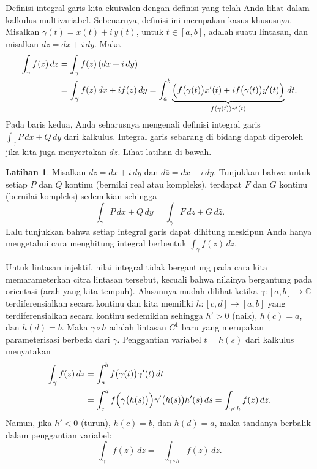\documentclass[12pt,openany]{book}
\newcommand{\C}{{\mathbb{C}}}
\theoremstyle{plain}
\theoremstyle{remark}
\theoremstyle{definition}
\newenvironment{exbox}{%
    \def\FrameCommand{\vrule width 1pt \relax\hspace{10pt}}%
    \MakeFramed{\advance\hsize-\width\FrameRestore}%
}{%
    \endMakeFramed
}
\theoremstyle{exercise}
\newtheorem{exercise}{Latihan}[section]
\theoremstyle{example}
\begin{document}
Definisi integral garis kita ekuivalen dengan definisi yang
telah Anda lihat dalam kalkulus multivariabel.  Sebenarnya, definisi ini merupakan kasus khususnya.
Misalkan $\gamma(t) = x(t) +i \, y(t)$, untuk $t \in [a,b]$, adalah suatu lintasan,
dan misalkan $dz = dx + i\, dy$.
Maka
\begin{equation*}
\begin{split}
\int_{\gamma} f(z) \, dz
& =
\int_{\gamma} f(z) \, (dx + i\, dy)
\\
& =
\int_{\gamma} f(z) \, dx + i f(z) \, dy
=
\int_a^b \underbrace{\Bigl( f\bigl(\gamma(t)\bigr) x'(t) + i f\bigl(\gamma(t)\bigr) y'(t) \Bigr)}_{f(\gamma(t)) \gamma'(t)} \, dt .
\end{split}
\end{equation*}
Pada baris kedua, Anda seharusnya mengenali definisi integral garis
$\int_\gamma P\,dx + Q \, dy$ dari kalkulus.  Integral garis sebarang
di bidang dapat diperoleh jika kita juga menyertakan $d\bar{z}$.  Lihat
latihan di bawah.

\begin{exbox}
\begin{exercise} \label{exercise:realpathintegral}
%
Misalkan $dz = dx + i \, dy$ dan
$d\bar{z} = dx - i \, dy$.  Tunjukkan bahwa untuk setiap $P$ dan $Q$ kontinu (bernilai real atau kompleks),
terdapat $F$ dan $G$ kontinu (bernilai kompleks) sedemikian sehingga
\begin{equation*}
\int_{\gamma} P \, dx + Q \, dy
=
\int_{\gamma} F \, dz + G \, d\bar{z} .
\end{equation*}
Lalu tunjukkan bahwa setiap integral garis
dapat dihitung meskipun Anda hanya mengetahui cara menghitung integral berbentuk
$\int_\gamma f(z) \, dz$.
\end{exercise}
\end{exbox}

Untuk lintasan injektif, nilai integral tidak bergantung pada cara
kita memarameterkan citra lintasan tersebut,
kecuali bahwa nilainya bergantung pada orientasi (arah yang kita tempuh).
Alasannya mudah dilihat ketika
$\gamma \colon [a,b] \to \C$ terdiferensialkan secara kontinu dan kita memiliki
$h \colon [c,d] \to [a,b]$ yang terdiferensialkan secara kontinu sedemikian
sehingga $h' > 0$ (naik), $h(c)=a$, dan $h(d) = b$.  Maka $\gamma \circ h$ adalah lintasan
$C^1$ baru yang merupakan parameterisasi berbeda dari $\gamma$.
Penggantian variabel $t=h(s)$ dari kalkulus menyatakan
\begin{equation*}
\begin{split}
\int_{\gamma} f(z) \, dz
& =
\int_a^b f\bigl( \gamma(t) \bigr) \gamma'(t) \, dt
\\
& =
\int_c^d f\Bigl( \gamma\bigl(h(s)\bigr) \Bigr) \gamma'\bigl(h(s)\bigr) h'(s) \, ds
=
\int_{\gamma \circ h} f(z) \, dz.
\end{split}
\end{equation*}
Namun, jika $h' < 0$ (turun), $h(c)=b$, dan $h(d)=a$, maka
tandanya berbalik dalam penggantian variabel:
\begin{equation*}
\int_{\gamma} f(z) \, dz =
- \int_{\gamma \circ h} f(z) \, dz.
\end{equation*}
\end{document}
